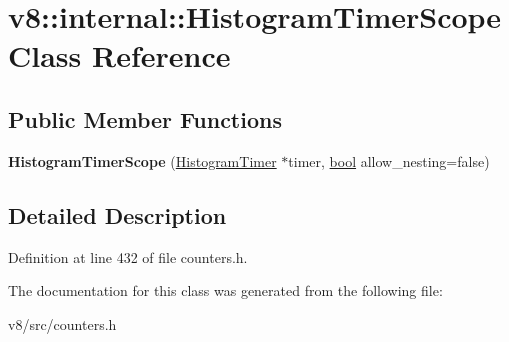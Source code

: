 \hypertarget{classv8_1_1internal_1_1HistogramTimerScope}{}\section{v8\+:\+:internal\+:\+:Histogram\+Timer\+Scope Class Reference}
\label{classv8_1_1internal_1_1HistogramTimerScope}
\subsection*{Public Member Functions}
\begin{DoxyCompactItemize}
\item 
\mbox{\label{classv8_1_1internal_1_1HistogramTimerScope_aa6b0b7026fab1c2a1e83bbf98f524b67}} 
{\bfseries Histogram\+Timer\+Scope} (\mbox{\hyperlink{classv8_1_1internal_1_1HistogramTimer}{Histogram\+Timer}} $\ast$timer, \mbox{\hyperlink{classbool}{bool}} allow\+\_\+nesting=false)
\end{DoxyCompactItemize}


\subsection{Detailed Description}


Definition at line 432 of file counters.\+h.



The documentation for this class was generated from the following file\+:\begin{DoxyCompactItemize}
\item 
v8/src/counters.\+h\end{DoxyCompactItemize}
